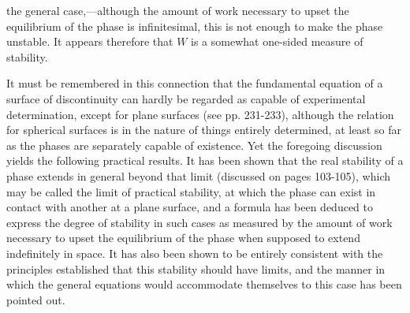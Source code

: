 \documentclass[12pt]{memoir}
\begin{document}
{the general case,---although the amount of work necessary to upset the equilibrium of the phase is infinitesimal, this is not enough to make the phase unstable. It appears therefore that $W$ is a somewhat one-sided measure of stability.

It must be remembered in this connection that the fundamental equation of a surface of discontinuity can hardly be regarded as capable of experimental determination, except for plane surfaces (see pp. 231-233), although the relation for spherical surfaces is in the nature of things entirely determined, at least so far as the phases are separately capable of existence. Yet the foregoing discussion yields the following practical results. It has been shown that the real stability of a phase extends in general beyond that limit (discussed on pages 103-105), which may be called the limit of practical stability, at which the phase can exist in contact with another at a plane surface, and a formula has been deduced to express the degree of stability in such cases as measured by the amount of work necessary to upset the equilibrium of the phase when supposed to extend indefinitely in space. It has also been shown to be entirely consistent with the principles established that this stability should have limits, and the manner in which the general equations would accommodate themselves to this case has been pointed out.

}
\end{document}

